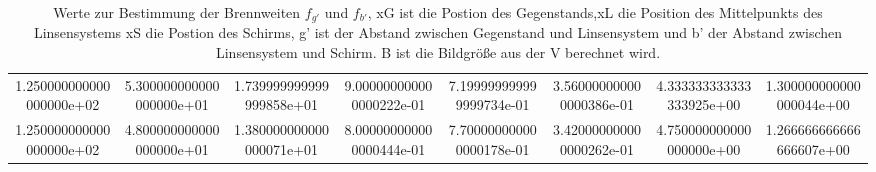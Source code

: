 \begin{table}
{\begin{tabular}{S S S S S S S S}
    1.250000000000000000e+02 & 5.300000000000000000e+01 & 1.739999999999999858e+01 & 9.000000000000000222e-01 & 7.199999999999999734e-01 & 3.560000000000000386e-01 & 4.333333333333333925e+00 & 1.300000000000000044e+00\\
    1.250000000000000000e+02 & 4.800000000000000000e+01 & 1.380000000000000071e+01 & 8.000000000000000444e-01 & 7.700000000000000178e-01 & 3.420000000000000262e-01 & 4.750000000000000000e+00 & 1.266666666666666607e+00\\
    \bottomrule
  \end{tabular}
  }
  \caption{Werte zur Bestimmung der Brennweiten \texorpdfstring{$f_{g'}$}{math}
  und \texorpdfstring{$f_{b'}$}{math},
  xG ist die Postion des Gegenstands,xL die Position des Mittelpunkts des
  Linsensystems xS die Postion des Schirms, g' ist der Abstand zwischen Gegenstand
  und Linsensystem und b' der Abstand zwischen Linsensystem und Schirm.
  B ist die Bildgröße aus der V berechnet wird.}
  \label{tab:abbe}
\end{table}
\FloatBarrier










%
